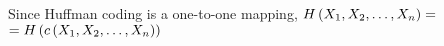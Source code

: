 \documentclass[ClusteringConnectionsMAIN.tex]{subfiles}
\begin{document}
	

  Since Huffman coding is a one-to-one mapping, $H \left(  X_1, X_2, \dots, X_n  \right) =$ $= H \left(  c \left( X_1, X_2, \dots, X_n \right)  \right)$
\end{document}
